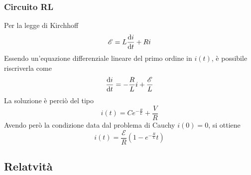 \subsubsection{Circuito RL}
\begin{center}
\end{center}
Per la legge di Kirchhoff
\begin{equation*}
  \mathcal{E} = L\frac{\mathop{}\!\mathrm{d} i}{\mathop{}\!\mathrm{d} t}+Ri
\end{equation*}
Essendo un'equazione differenziale lineare del primo ordine in $i(t)$, è possibile riscriverla
come
\begin{equation*}
  \frac{\mathop{}\!\mathrm{d} i}{\mathop{}\!\mathrm{d} t}=-\frac{R}{L}i+\frac{\mathcal{E}}{L}
\end{equation*}
La soluzione è perciò del tipo
\begin{equation*}
  i(t) = Ce^{-\frac{R}{L}}+\frac{V}{R}
\end{equation*}
Avendo però la condizione data dal problema di Cauchy $i(0)=0$, si ottiene
\begin{equation*}
  i(t)=\frac{\mathcal{E}}{R}\left( 1-e^{-\frac{R}{L}}t \right)
\end{equation*}

\subsection{Relatvità}
